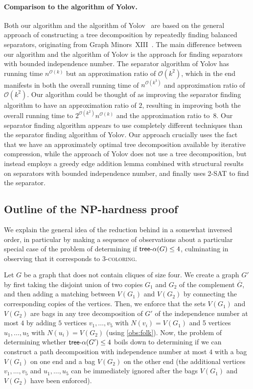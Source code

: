 \documentclass[11pt]{article}
\theoremstyle{definition}
\newcommand{\tin}{\mathsf{tree} \textnormal{-} \alpha}
\newcommand{\NP}{\textup{\textsf{NP}}}
\newcommand{\OO}{\mathcal{O}}
\begin{document}
\paragraph*{Comparison to the algorithm of Yolov.}
Both our algorithm and the algorithm of Yolov~\cite{Yolov18} are based on the general approach of constructing a tree decomposition by repeatedly finding balanced separators, originating from Graph Minors~XIII~\cite{RobertsonS-GMXIII}.
The main difference between our algorithm and the algorithm of Yolov is the approach for finding separators with bounded independence number.
The separator algorithm of Yolov has running time $n^{\OO(k)}$ but an approximation ratio of $\OO(k^2)$, which in the end manifests in both the overall running time of $n^{\OO(k^3)}$ and approximation ratio of $\OO(k^2)$.
Our algorithm could be thought of as improving the separator finding algorithm to have an approximation ratio of $2$, resulting in improving both the overall running time to $2^{\OO(k^2)} n^{\OO(k)}$ and the approximation ratio to~$8$.
Our separator finding algorithm appears to use completely different techniques than the separator finding algorithm of Yolov.
Our approach crucially uses the fact that we have an approximately optimal tree decomposition available by iterative compression, while the approach of Yolov does not use a tree decomposition, but instead employs a greedy edge addition lemma combined with structural results on separators with bounded independence number, and finally uses 2-SAT to find the separator.



\subsection{Outline of the \texorpdfstring{\NP}{NP}-hardness proof}
We explain the general idea of the reduction behind  in a somewhat inversed order, in particular by making a sequence of observations about a particular special case of the problem of determining if $\tin(G) \le 4$, culminating in observing that it corresponds to \textsc{3-coloring}.


Let $G$ be a graph that does not contain cliques of size four.
We create a graph $G'$ by first taking the disjoint union of two copies $G_1$ and $G_2$ of the complement $\overline{G}$, and then adding a matching between $V(G_1)$ and $V(G_2)$ by connecting the corresponding copies of the vertices.
Then, we enforce that the sets $V(G_1)$ and $V(G_2)$ are bags in any tree decomposition of $G'$ of the independence number at most $4$ by adding $5$ vertices $v_1, \ldots, v_5$ with $N(v_i) = V(G_1)$ and 5 vertices $u_1, \ldots, u_5$ with $N(u_i) = V(G_2)$ (using \cref{obs:folk}).
Now, the problem of determining whether $\tin(G') \le 4$ boils down to determining if we can construct a path decomposition with independence number at most $4$ with a bag $V(G_1)$ on one end and a bag $V(G_2)$ on the other end (the additional vertices $v_1, \ldots, v_5$ and $u_1, \ldots, u_5$ can be immediately ignored after the bags $V(G_1)$ and $V(G_2)$ have been enforced).
\end{document}
